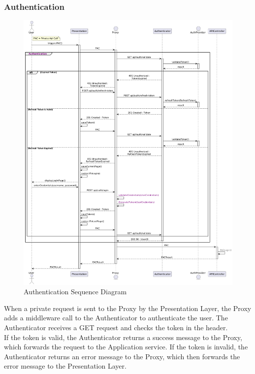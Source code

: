\subsubsection*{Authentication}
\begin{figure}[H]
    \centering
    \includegraphics[width=\linewidth]{Latex/Images/DD/SequenceDiagrams/1.2Authentication.png}
    \caption{Authentication Sequence Diagram}
    \label{fig:authentication}
\end{figure}
When a private request is sent to the Proxy by the Presentation Layer, the Proxy adds a middleware call to the Authenticator to authenticate the user. The Authenticator receives a GET request and checks the token in the header.\\
If the token is valid, the Authenticator returns a success message to the Proxy, which forwards the request to the Application service.
If the token is invalid, the Authenticator returns an error message to the Proxy, which then forwards the error message to the Presentation Layer.\\
